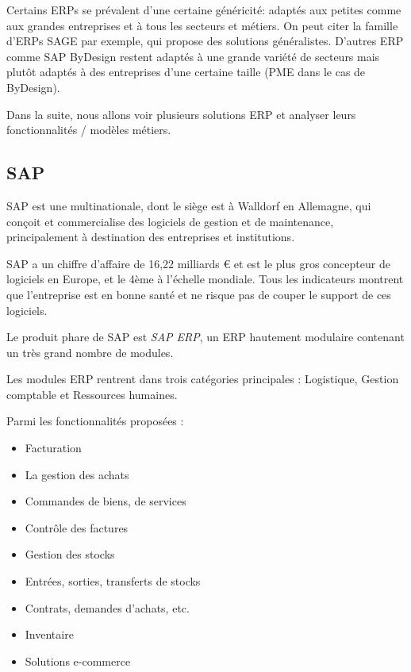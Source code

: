     Certains ERPs se prévalent d'une certaine généricité: adaptés aux petites comme aux grandes entreprises et à tous les secteurs et métiers. On peut citer la famille d'ERPs SAGE par exemple, qui propose des solutions généralistes. D'autres ERP comme SAP ByDesign restent adaptés à une grande variété de secteurs mais plutôt adaptés à des entreprises d'une certaine taille (PME dans le cas de ByDesign).

    Dans la suite, nous allons voir plusieurs solutions ERP et analyser leurs fonctionnalités / modèles métiers.

    \subsection{SAP}

        SAP est une multinationale, dont le siège est à Walldorf en Allemagne, qui conçoit et commercialise des logiciels de gestion et de maintenance, principalement à destination des entreprises et institutions.

        SAP a un chiffre d'affaire de 16,22 milliards € et est le plus gros concepteur de logiciels en Europe, et le 4ème à l'échelle mondiale. Tous les indicateurs montrent que l'entreprise est en bonne santé et ne risque pas de couper le support de ces logiciels.

        Le produit phare de SAP est \textit{SAP ERP}, un ERP hautement modulaire contenant un très grand nombre de modules.

        Les modules ERP rentrent dans trois catégories principales : Logistique, Gestion comptable et Ressources humaines.

        Parmi les fonctionnalités proposées :

        \begin{itemize}
            \item Facturation
            \item La gestion des achats
            \item Commandes de biens, de services
            \item Contrôle des factures
            \item Gestion des stocks
            \item Entrées, sorties, transferts de stocks
            \item Contrats, demandes d'achats, etc.
            \item Inventaire
            \item Solutions e-commerce
        \end{itemize}



